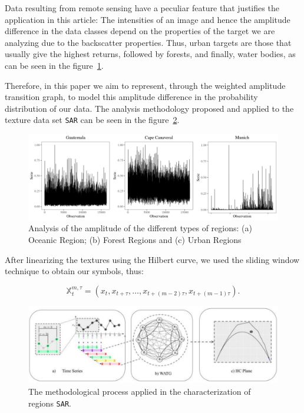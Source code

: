 \documentclass{isprs}
\begin{document}
	Data resulting from remote sensing have a peculiar feature that justifies the application in this article:
	The intensities of an image and hence the amplitude difference in the data classes depend on the properties of the target we are analyzing due to the backscatter properties.
	Thus, urban targets are those that usually give the highest returns, followed by forests, and finally, water bodies, as can be seen in the figure~\ref{fig:AmplitudeSAR}.
	
	Therefore, in this paper we aim to represent, through the weighted amplitude transition graph, to model this amplitude difference in the probability distribution of our data.
	The analysis methodology proposed and applied to the texture data set \texttt{SAR} can be seen in the figure~\ref{fig:WATG}.
	
	\begin{figure}[hbt]
		\includegraphics[scale = 0.28]{Figures/SAR_signal.pdf}
		\caption{Analysis of the amplitude of the different types of regions: (a) Oceanic Region; (b) Forest Regions and (c) Urban Regions}
		\label{fig:AmplitudeSAR}
	\end{figure}
	
	After linearizing the textures using the Hilbert curve, we used the sliding window technique to obtain our symbols, thus:
	
	\begin{equation}
	\mathbb{X}_t^{m,\tau} = (x_{t}, x_{t+\tau},\ldots, x_{t+(m-2)\tau} ,x_{t+(m-1)\tau}).
	\end{equation}
	
	\begin{figure}[hbt]
		\centering
		\includegraphics[scale = 0.25]{Figures/WATG.pdf}
		\caption{The methodological process applied in the characterization of regions \texttt{SAR}.}
		\label{fig:WATG}
	\end{figure}
	
\end{document}
